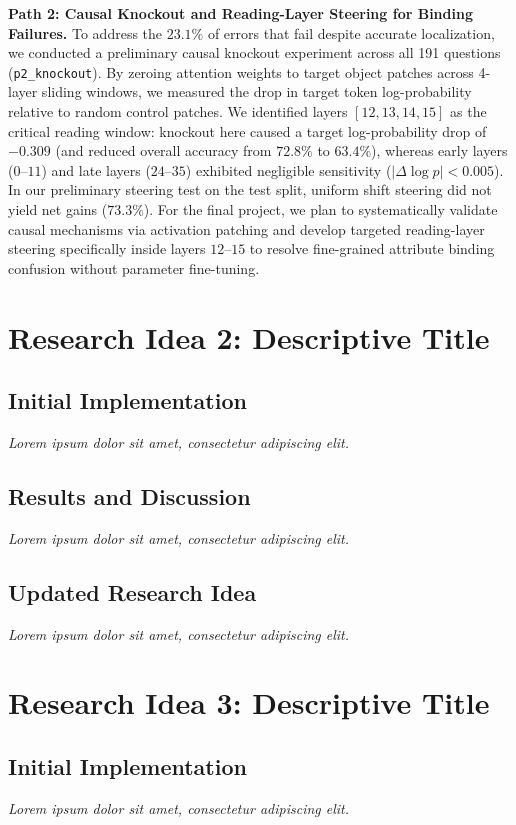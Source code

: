 \documentclass{article}
\newcommand{\dummytext}{\textit{Lorem ipsum dolor sit amet, consectetur adipiscing elit.}}
\begin{document}
\textbf{Path 2: Causal Knockout and Reading-Layer Steering for Binding Failures.}
To address the $23.1\%$ of errors that fail despite accurate localization, we conducted a preliminary causal knockout experiment across all 191 questions (\texttt{p2\_knockout}). By zeroing attention weights to target object patches across 4-layer sliding windows, we measured the drop in target token log-probability relative to random control patches. We identified layers $[12, 13, 14, 15]$ as the critical reading window: knockout here caused a target log-probability drop of $-0.309$ (and reduced overall accuracy from $72.8\%$ to $63.4\%$), whereas early layers ($0$--$11$) and late layers ($24$--$35$) exhibited negligible sensitivity ($|\Delta \log p| < 0.005$). In our preliminary steering test on the test split, uniform shift steering did not yield net gains ($73.3\%$). For the final project, we plan to systematically validate causal mechanisms via activation patching and develop targeted reading-layer steering specifically inside layers $12$--$15$ to resolve fine-grained attribute binding confusion without parameter fine-tuning.

\section{Research Idea 2: Descriptive Title}

\subsection{Initial Implementation}
\dummytext





\subsection{Results and Discussion}
\dummytext

\subsection{Updated Research Idea}
\dummytext

\section{Research Idea 3: Descriptive Title}

\subsection{Initial Implementation}
\dummytext
\end{document}
